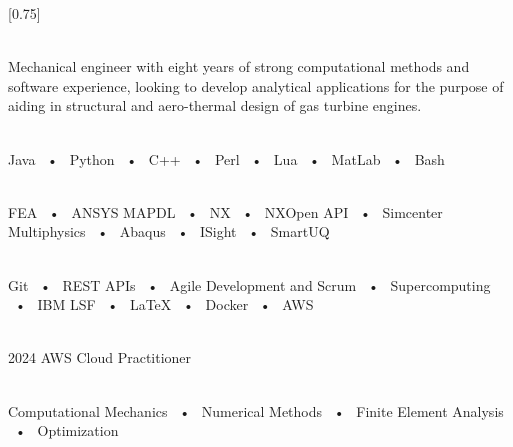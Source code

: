 \documentclass[darkhipster]{simplehipstercv}
\begin{document}
\setlength{\columnsep}{1.5cm}
[0.75]
\begin{paracol}{2}

\paracolbackgroundoptions



\footnotesize
{\setasidefontcolour
\flushleft
\begin{center}
\end{center}


\\[0.5em]

{\footnotesize
Mechanical engineer with eight years of strong computational methods and software experience, looking to develop analytical
 applications for the purpose of aiding in structural and aero-thermal design of gas turbine engines.}
\bigskip
\bigskip

 \\[0.5em]

Java ~•~ Python ~•~ C++ ~•~ Perl ~•~ Lua ~•~ MatLab ~•~ Bash

\bigskip
\bigskip

\\[0.5em]

FEA ~•~ ANSYS MAPDL ~•~ NX ~•~ NXOpen API ~•~ Simcenter Multiphysics ~•~ Abaqus ~•~ ISight ~•~ SmartUQ

\bigskip
\bigskip

\\[0.5em]

Git ~•~ REST APIs ~•~ Agile Development and Scrum ~•~ Supercomputing ~•~ IBM LSF ~•~ LaTeX ~•~ Docker ~•~ AWS

\bigskip
\bigskip

\\[0.5em]

2024 AWS Cloud Practitioner

\bigskip
\bigskip

\\[0.5em]

Computational Mechanics ~•~ Numerical Methods ~•~ Finite Element Analysis ~•~ Optimization

\vspace{8em}

}
\end{paracol}
\end{document}
